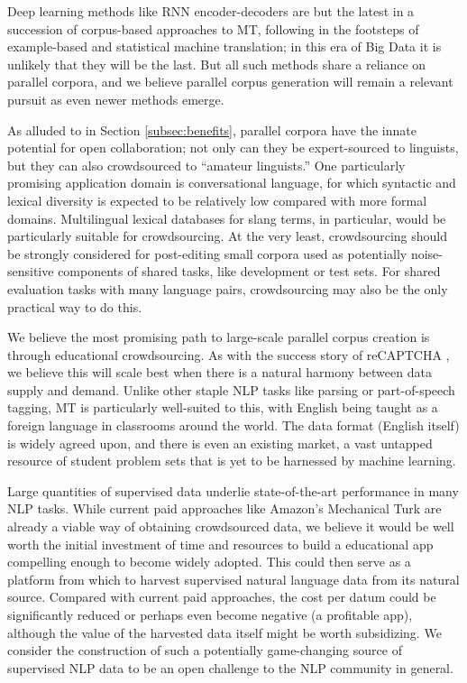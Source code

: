 Deep learning methods like RNN encoder-decoders  are but the latest in a succession of corpus-based approaches to MT, following in the footsteps of example-based and statistical machine translation; in this era of Big Data it is unlikely that they will be the last.
But all such methods share a reliance on parallel corpora, and we believe parallel corpus generation will remain a relevant pursuit as even newer methods emerge.

As alluded to in Section \ref{subsec:benefits}, parallel corpora have the innate potential for open collaboration; not only can they be expert-sourced to linguists, but they can also crowdsourced to ``amateur linguists.''
One particularly promising application domain is conversational language, for which syntactic and lexical diversity is expected to be relatively low compared with more formal domains. 
Multilingual lexical databases for slang terms, in particular, would be particularly suitable for crowdsourcing.
At the very least, crowdsourcing should be strongly considered for post-editing small corpora used as potentially noise-sensitive components of shared tasks, like development or test sets.
For shared evaluation tasks with many language pairs, crowdsourcing may also be the only practical way to do this.

We believe the most promising path to large-scale parallel corpus creation is through educational crowdsourcing.
As with the success story of reCAPTCHA , we believe this will scale best when there is a natural harmony between data supply and demand.
Unlike other staple NLP tasks like parsing or part-of-speech tagging, MT is particularly well-suited to this, with English being taught as a foreign language in classrooms around the world.
The data format (English itself) is widely agreed upon, and there is even an existing market, a vast untapped resource of student problem sets that is yet to be harnessed by machine learning.

Large quantities of supervised data underlie state-of-the-art performance in many NLP tasks.
While current paid approaches like Amazon's Mechanical Turk are already a viable way of obtaining crowdsourced data, we believe it would be well worth the initial investment of time and resources to build a educational app compelling enough to become widely adopted.
This could then serve as a platform from which to harvest supervised natural language data from its natural source. 
Compared with current paid approaches, the cost per datum could be significantly reduced or perhaps even become negative (a profitable app), although the value of the harvested data itself might be worth subsidizing.
We consider the construction of such a potentially game-changing source of supervised NLP data to be an open challenge to the NLP community in general.







